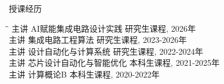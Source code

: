 \begin{rSection}{授课经历}

\begin{tabbing}
\hspace{1.5in}\= \hspace{3.4in}\= \kill
主讲 \> AI赋能集成电路设计实践 \> { 研究生课程, 2026年 } \\
主讲 \> 集成电路工程算法 \> { 研究生课程, 2023-2026年 } \\
主讲 \> 设计自动化与计算系统 \> { 研究生课程, 2022-2024年} \\
主讲 \> 芯片设计自动化与智能优化 \> { 本科生课程, 2021-2025年 } \\
主讲 \> 计算概论B \> { 本科生课程, 2020-2022年 } \\
\end{tabbing}

\end{rSection}
